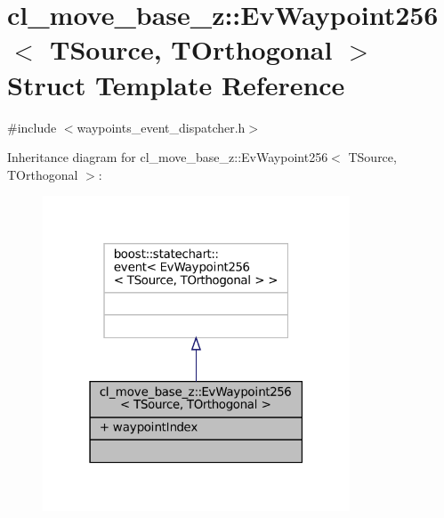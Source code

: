 \hypertarget{structcl__move__base__z_1_1EvWaypoint256}{}\section{cl\+\_\+move\+\_\+base\+\_\+z\+:\+:Ev\+Waypoint256$<$ T\+Source, T\+Orthogonal $>$ Struct Template Reference}
\label{structcl__move__base__z_1_1EvWaypoint256}


{\ttfamily \#include $<$waypoints\+\_\+event\+\_\+dispatcher.\+h$>$}



Inheritance diagram for cl\+\_\+move\+\_\+base\+\_\+z\+:\+:Ev\+Waypoint256$<$ T\+Source, T\+Orthogonal $>$\+:
\nopagebreak
\begin{figure}[H]
\begin{center}
\leavevmode
\includegraphics[width=259pt]{structcl__move__base__z_1_1EvWaypoint256__inherit__graph}
\end{center}
\end{figure}


